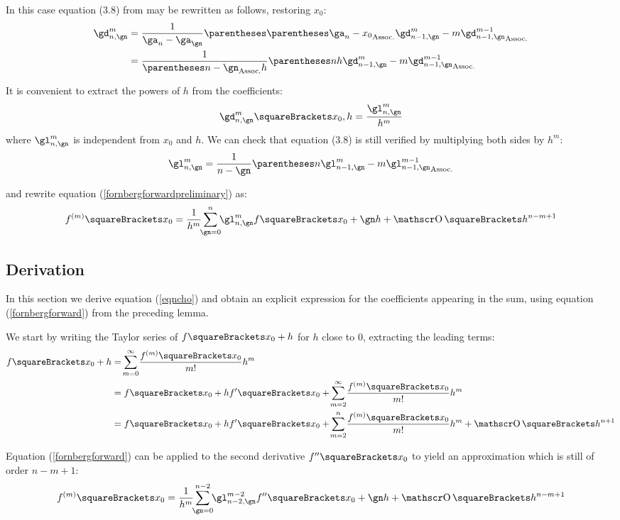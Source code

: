 \documentclass[10pt, a4paper, twoside]{basestyle}
\begin{document}
In this case equation (3.8) from \cite{Fornberg1987} may be rewritten as follows, restoring $x_0$:
\begin{align*}
\gd^{m}_{n,\gn} &= \frac{1}{\ga_n - \ga_\gn}\pa{\pa{\ga_n - x_0} \gd^{m}_{n - 1,\gn} - m \gd^{m - 1}_{n - 1,\gn}}\\
&= \frac{1}{\pa{n - \gn} h} \pa{n h \gd^{m}_{n - 1,\gn} - m \gd^{m - 1}_{n - 1,\gn}}
\end{align*}

It is convenient to extract the powers of $h$ from the coefficients:
\[
\gd^{m}_{n,\gn}\of{x_0, h} = \frac{\gl^{m}_{n,\gn}}{h^m}
\]
where $\gl^{m}_{n,\gn}$ is independent from $x_0$ and $h$.  We can check that equation (3.8) is still verified by multiplying both sides by $h^m$:
\[
\gl^{m}_{n,\gn} = \frac{1}{n - \gn} \pa{n \gl^{m}_{n - 1,\gn} - m \gl^{m - 1}_{n - 1,\gn}}
\]

and rewrite equation (\ref{fornbergforwardpreliminary}) as:
\begin{equation}
f^{(m)}\of{x_0} = \frac{1}{h^m} \sum{\gn = 0}[n]{\gl^{m}_{n,\gn} f\of{x_0 + \gn h}} + \BigO\of{h^{n - m + 1}}
\label{fornbergforward}
\end{equation}


\subsection*{Derivation}
In this section we derive equation (\ref{eqncho}) and obtain an explicit expression for the coefficients appearing in the sum, using equation (\ref{fornbergforward}) from the preceding lemma.

We start by writing the Taylor series of $f\of{x_0 + h}$ for $h$ close to $0$, extracting the leading terms:
\begin{align}
f\of{x_0 + h} &= \sum{m = 0}[\infty]{\frac{f^{(m)}\of{x_0}}{\Factorial{m}} h^m} \nonumber \\
&=f\of{x_0} + h f\der\of{x_0} + \sum{m = 2}[\infty]{\frac{f^{(m)}\of{x_0}}{\Factorial{m}} h^m} \nonumber \\
&=f\of{x_0} + h f\der\of{x_0} + \sum{m = 2}[n]{\frac{f^{(m)}\of{x_0}}{\Factorial{m}} h^m} + \BigO\of{h^{n+1}} \label{eqntaylor}
\end{align}

Equation (\ref{fornbergforward}) can be applied to the second derivative $f\dersecond\of{x_0}$ to yield an approximation which is still of order $n - m + 1$:
\[
f^{(m)}\of{x_0} = \frac{1}{h^m} \sum{\gn = 0}[n - 2]{\gl^{m - 2}_{n - 2,\gn} f\dersecond\of{x_0 + \gn h}} + \BigO\of{h^{n - m + 1}}
\]
\end{document}
